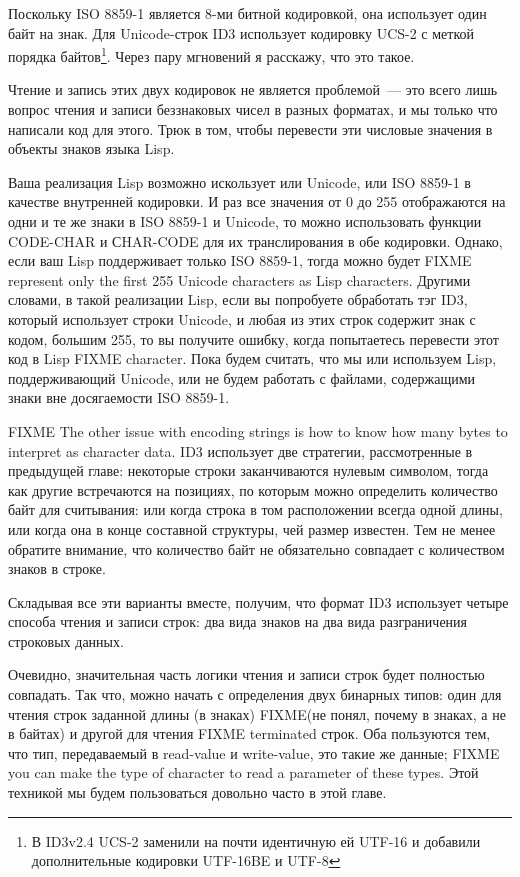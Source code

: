 Поскольку ISO 8859-1 является 8-ми битной кодировкой, она использует один байт на
знак. Для Unicode-строк ID3 использует кодировку UCS-2 с меткой порядка байтов\footnote{В
  ID3v2.4 UCS-2 заменили на почти идентичную ей UTF-16 и добавили дополнительные кодировки
  UTF-16BE и UTF-8}. Через пару мгновений я расскажу, что это такое.

Чтение и запись этих двух кодировок не является проблемой~--- это всего лишь вопрос чтения
и записи беззнаковых чисел в разных форматах, и мы только что написали код для этого.
Трюк в том, чтобы перевести эти числовые значения в объекты знаков языка Lisp.

Ваша реализация Lisp возможно искользует или Unicode, или ISO 8859-1 в качестве внутренней
кодировки.  И раз все значения от 0 до 255 отображаются на одни и те же знаки в ISO 8859-1
и Unicode, то можно использовать функции CODE-CHAR и СHAR-CODE для их транслирования в обе
кодировки.  Однако, если ваш Lisp поддерживает только ISO 8859-1, тогда можно будет FIXME
represent only the first 255 Unicode characters as Lisp characters.  Другими словами, в
такой реализации Lisp, если вы попробуете обработать тэг ID3, который использует строки
Unicode, и любая из этих строк содержит знак с кодом, большим 255, то вы получите ошибку,
когда попытаетесь перевести этот код в Lisp FIXME character.  Пока будем считать, что мы
или используем Lisp, поддерживающий Unicode, или не будем работать с файлами, содержащими
знаки вне досягаемости ISO 8859-1.

FIXME The other issue with encoding strings is how to know how many bytes to interpret as
character data.  ID3 использует две стратегии, рассмотренные в предыдущей главе: некоторые
строки заканчиваются нулевым символом, тогда как другие встречаются на позициях, по
которым можно определить количество байт для считывания: или когда строка в том
расположении всегда одной длины, или когда она в конце составной структуры, чей размер
известен.  Тем не менее обратите внимание, что количество байт не обязательно совпадает с
количеством знаков в строке.

Складывая все эти варианты вместе, получим, что формат ID3 использует четыре способа
чтения и записи строк: два вида знаков на два вида разграничения строковых данных.

Очевидно, значительная часть логики чтения и записи строк будет полностью совпадать.  Так
что, можно начать с определения двух бинарных типов: один для чтения строк заданной длины
(в знаках) FIXME(не понял, почему в знаках, а не в байтах) и другой для чтения FIXME
terminated строк.  Оба пользуются тем, что тип, передаваемый в read-value и write-value,
это такие же данные; FIXME you can make the type of character to read a parameter of these
types.  Этой техникой мы будем пользоваться довольно часто в этой главе.

